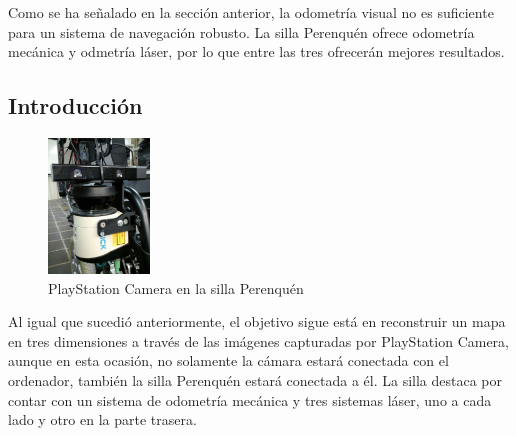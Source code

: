 

Como se ha señalado en la sección anterior, la odometría visual no es suficiente
para un sistema de navegación robusto. La silla Perenquén ofrece odometría
mecánica y odmetría láser, por lo que entre las tres ofrecerán mejores
resultados.

\subsection{Introducción}

\begin{figure}
  \vspace{-20pt}
  \begin{center}
    \includegraphics[width=0.24\textwidth]{images/cap4/Perenquen-camara.eps}
  \end{center}
  \vspace{-20pt}
  \caption{PlayStation Camera en la silla Perenquén}
  \vspace{-10pt}
  \label{fig:Perenquen-Camara}
\end{figure}

Al igual que sucedió anteriormente, el objetivo sigue está en reconstruir un
mapa en tres dimensiones a través de las imágenes capturadas por PlayStation
Camera, aunque en esta ocasión, no solamente la cámara estará conectada con el
ordenador, también la silla Perenquén estará conectada a él. La silla destaca
por contar con un sistema de odometría mecánica y tres sistemas láser, uno a
cada lado y otro en la parte trasera.


